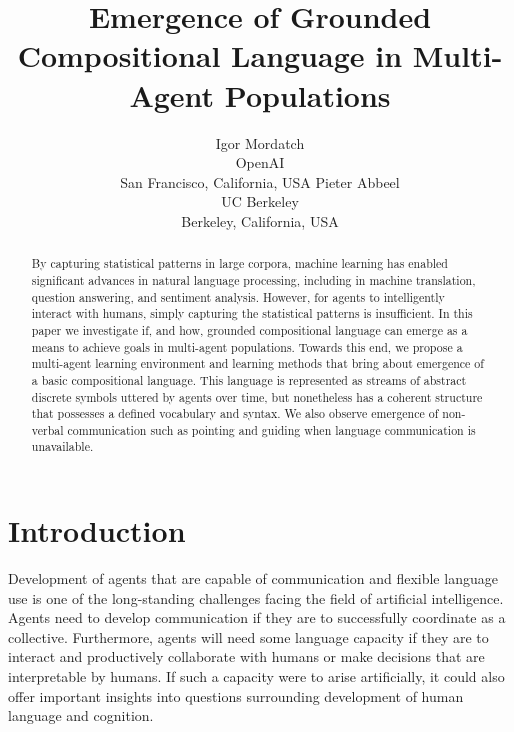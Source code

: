 \documentclass[letterpaper]{article} %
\newcommand{\IM}[1]{\textbf{\textcolor{red}{[IM: #1]}}}
\begin{document}
%
\title{Emergence of Grounded Compositional Language in Multi-Agent Populations}

\author{Igor Mordatch\\ OpenAI \\ San Francisco, California, USA
  \And Pieter Abbeel\\
  UC Berkeley \\ Berkeley, California, USA}

\maketitle
\begin{abstract}
By capturing statistical patterns in large corpora, machine learning has enabled significant advances in natural language processing, including in machine translation, question answering, and sentiment analysis.  However, for agents to intelligently interact with humans, simply capturing the statistical patterns is insufficient. In this paper we investigate if, and how, grounded compositional language can emerge as a means to achieve goals in multi-agent populations.  Towards this end, we propose a multi-agent learning environment and learning methods that bring about emergence of a basic compositional language. This language is represented as streams of abstract discrete symbols uttered by agents over time, but nonetheless has a coherent structure that possesses a defined vocabulary and syntax. We also observe emergence of non-verbal communication such as pointing and guiding when language communication is unavailable. 
\end{abstract}

\section{Introduction}
\label{sec:introduction}

Development of agents that are capable of communication and flexible language use is one of the long-standing challenges facing the field of artificial intelligence. Agents need to develop communication if they are to successfully coordinate as a collective. Furthermore, agents will need some language capacity if they are to interact and productively collaborate with humans or make decisions that are interpretable by humans. If such a capacity were to arise artificially, it could also offer important insights into questions surrounding development of human language and cognition.%
\end{document}
